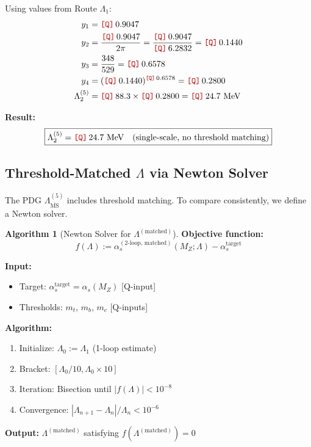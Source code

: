 \documentclass[11pt,a4paper]{article}
\newcommand{\Qnum}[1]{\textcolor{red!70!black}{\texttt{[Q]}}\,#1}
\theoremstyle{definition}
\newtheorem{algorithm}{Algorithm}[section]
\begin{document}
\begin{quarantinebox}
Using values from Route $\Lambda_1$:
\begin{align}
\label{eq:lambda2-num1}
y_1 &= \Qnum{0.9047} \\
\label{eq:lambda2-num2}
y_2 &= \frac{\Qnum{0.9047}}{2\pi} = \frac{\Qnum{0.9047}}{\Qnum{6.2832}} = \Qnum{0.1440} \\
\label{eq:lambda2-num3}
y_3 &= \frac{348}{529} = \Qnum{0.6578} \\
\label{eq:lambda2-num4}
y_4 &= (\Qnum{0.1440})^{\Qnum{0.6578}} = \Qnum{0.2800} \\
\label{eq:lambda2-num5}
\Lambda_2^{(5)} &= \Qnum{88.3} \times \Qnum{0.2800} = \Qnum{24.7} \text{ MeV}
\end{align}

\textbf{Result:}
\begin{equation}
\label{eq:lambda2-result}
\boxed{\Lambda_2^{(5)} = \Qnum{24.7} \text{ MeV} \quad \text{(single-scale, no threshold matching)}}
\end{equation}
\end{quarantinebox}

\subsection{Threshold-Matched $\Lambda$ via Newton Solver}
\label{subsec:newton-solver}

The PDG $\Lambda_{\overline{\text{MS}}}^{(5)}$ includes threshold matching.
To compare consistently, we define a Newton solver.

\begin{algorithm}[Newton Solver for $\Lambda^{(\text{matched})}$]
\label{alg:newton}
\textbf{Objective function:}
\begin{equation}
\label{eq:newton-objective}
f(\Lambda) := \alpha_s^{(2\text{-loop, matched})}(M_Z; \Lambda) - \alpha_s^{\text{target}}
\end{equation}

\textbf{Input:}
\begin{itemize}
  \item Target: $\alpha_s^{\text{target}} = \alpha_s(M_Z)$ [Q-input]
  \item Thresholds: $m_t$, $m_b$, $m_c$ [Q-inputs]
\end{itemize}

\textbf{Algorithm:}
\begin{enumerate}
  \item Initialize: $\Lambda_0 := \Lambda_1$ (1-loop estimate)
  \item Bracket: $[\Lambda_0/10, \Lambda_0 \times 10]$
  \item Iteration: Bisection until $|f(\Lambda)| < 10^{-8}$
  \item Convergence: $|\Lambda_{n+1} - \Lambda_n|/\Lambda_n < 10^{-6}$
\end{enumerate}

\textbf{Output:}
$\Lambda^{(\text{matched})}$ satisfying $f(\Lambda^{(\text{matched})}) = 0$
\end{algorithm}
\end{document}

